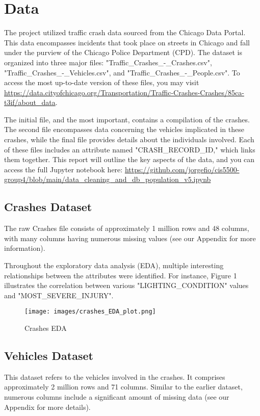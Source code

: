 \documentclass[12pt]{article}
\begin{document}
\section{Data}

The project utilized traffic crash data sourced from the Chicago Data Portal. This data encompasses incidents that took place on streets in Chicago and fall under the purview of the Chicago Police Department (CPD). The dataset is organized into three major files: "Traffic\_Crashes\_-\_Crashes.csv", "Traffic\_Crashes\_-\_Vehicles.csv", and "Traffic\_Crashes\_-\_People.csv". To access the most up-to-date version of these files, you may visit \url{https://data.cityofchicago.org/Transportation/Traffic-Crashes-Crashes/85ca-t3if/about_data}.

The initial file, and the most important, contains a compilation of the crashes. The second file encompasses data concerning the vehicles implicated in these crashes, while the final file provides details about the individuals involved. Each of these files includes an attribute named "CRASH\_RECORD\_ID," which links them together. This report will outline the key aspects of the data, and you can access the full Jupyter notebook here: \url{https://github.com/jorgefio/cis5500-group4/blob/main/data_cleaning_and_db_population_v5.ipynb}


\subsection{Crashes Dataset}
The raw Crashes file consists of approximately 1 million rows and 48 columns, with many columns having numerous missing values (see our Appendix for more information).

Throughout the exploratory data analysis (EDA), multiple interesting relationships between the attributes were identified. For instance, Figure 1 illustrates the correlation between various "LIGHTING\_CONDITION" values and "MOST\_SEVERE\_INJURY".


\begin{figure}
    \centering
    \texttt{[image: images/crashes\_EDA\_plot.png]}
    \caption{Crashes EDA}
    \label{fig:enter-label}
\end{figure}


\subsection{Vehicles Dataset}

This dataset refers to the vehicles involved in the crashes. It comprises approximately 2 million rows and 71 columns. Similar to the earlier dataset, numerous columns include a significant amount of missing data (see our Appendix for more details).
\end{document}
